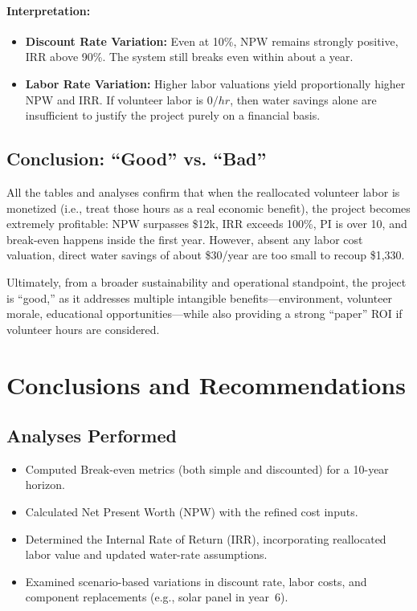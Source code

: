 \documentclass[12pt]{report}
\begin{document}
\paragraph{Interpretation:}
\begin{itemize}
    \item \textbf{Discount Rate Variation:} Even at 10\%, NPW remains strongly positive, IRR above 90\%. The system still breaks even within about a year.
    \item \textbf{Labor Rate Variation:} Higher labor valuations yield proportionally higher NPW and IRR. If volunteer labor is $0/hr$, then water savings alone are insufficient to justify the project purely on a financial basis.
\end{itemize}

\subsection{Conclusion: ``Good'' vs. ``Bad''}
All the tables and analyses confirm that when the reallocated volunteer labor is monetized (i.e., treat those hours as a real economic benefit), the project becomes extremely profitable: NPW surpasses \$12k, IRR exceeds 100\%, PI is over 10, and break-even happens inside the first year. However, absent any labor cost valuation, direct water savings of about \$30/year are too small to recoup \$1,330. 

Ultimately, from a broader sustainability and operational standpoint, the project is “good,” as it addresses multiple intangible benefits—environment, volunteer morale, educational opportunities—while also providing a strong “paper” ROI if volunteer hours are considered.

\newpage

\section{Conclusions and Recommendations}
\vspace{-0.5em}

\subsection{Analyses Performed}
\begin{itemize}
    \item Computed Break-even metrics (both simple and discounted) for a 10-year horizon.
    \item Calculated Net Present Worth (NPW) with the refined cost inputs.
    \item Determined the Internal Rate of Return (IRR), incorporating reallocated labor value and updated water-rate assumptions.
    \item Examined scenario-based variations in discount rate, labor costs, and component replacements (e.g., solar panel in year~6).
\end{itemize}
\end{document}
